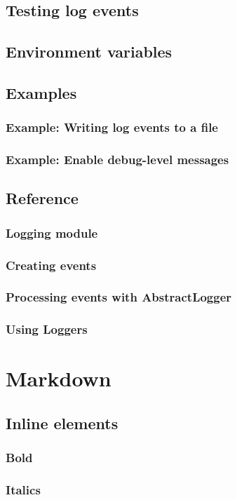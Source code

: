     \section{Testing log events}
    \section{Environment variables}
    \section{Examples}
    \subsection{Example: Writing log events to a file}
    \subsection{Example: Enable debug-level messages}
    \section{Reference}
    \subsection{Logging module}
    \subsection{Creating events}
    \subsection{Processing events with AbstractLogger}
    \subsection{Using Loggers}
\chapter{Markdown}
    \section{Inline elements}
    \subsection{Bold}
    \subsection{Italics}
